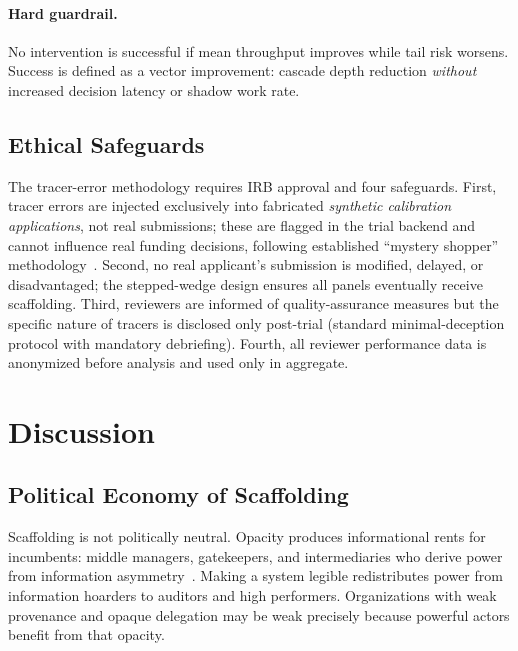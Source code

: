 \documentclass[runningheads]{llncs}
\begin{document}
\paragraph{Hard guardrail.}
No intervention is successful if mean throughput improves while tail risk worsens. Success is defined as a vector improvement: cascade depth reduction \emph{without} increased decision latency or shadow work rate.

\subsection{Ethical Safeguards}
\label{sec:ethics}

The tracer-error methodology requires IRB approval and four safeguards. First, tracer errors are injected exclusively into fabricated \emph{synthetic calibration applications}, not real submissions; these are flagged in the trial backend and cannot influence real funding decisions, following established ``mystery shopper'' methodology~\cite{wendler2004deception}. Second, no real applicant's submission is modified, delayed, or disadvantaged; the stepped-wedge design ensures all panels eventually receive scaffolding. Third, reviewers are informed of quality-assurance measures but the specific nature of tracers is disclosed only post-trial (standard minimal-deception protocol with mandatory debriefing). Fourth, all reviewer performance data is anonymized before analysis and used only in aggregate.


\section{Discussion}
\label{sec:discussion}

\subsection{Political Economy of Scaffolding}

Scaffolding is not politically neutral. Opacity produces informational rents for incumbents: middle managers, gatekeepers, and intermediaries who derive power from information asymmetry~\cite{holmstrom1991multitask}. Making a system legible redistributes power from information hoarders to auditors and high performers. Organizations with weak provenance and opaque delegation may be weak precisely because powerful actors benefit from that opacity.
\end{document}
